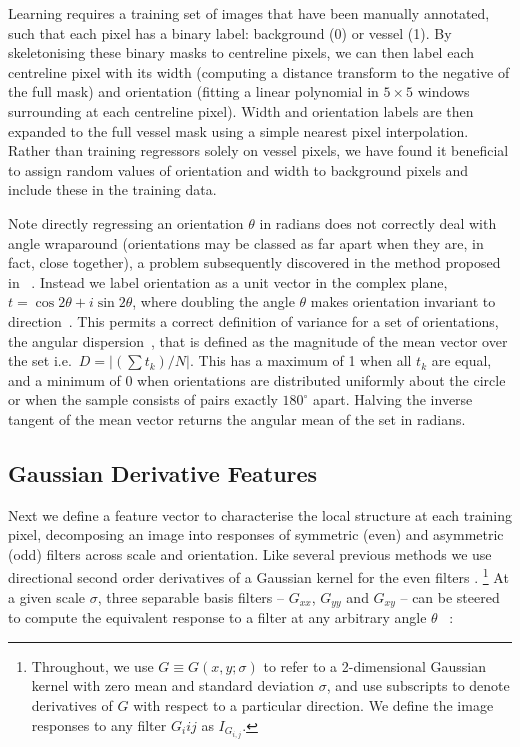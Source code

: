 \documentclass[runningheads,a4paper]{llncs}
\def\Gxx{G_{xx}}
\def\Gxy{G_{xy}}
\def\Gyy{G_{yy}}
\def\ie{i.e.}
\begin{document}
Learning requires a training set of images that have been manually annotated, such that each pixel has a binary label: background (0) or vessel (1). By skeletonising these binary masks to centreline pixels, we can then label each centreline pixel with its width (computing a distance transform to the negative of the full mask) and orientation (fitting a linear polynomial in $5\times5$ windows surrounding at each centreline pixel). Width and orientation labels are then expanded to the full vessel mask using a simple nearest pixel interpolation. Rather than training regressors solely on vessel pixels, we have found it beneficial to assign random values of orientation and width to background pixels and include these in the training data.

Note directly regressing an orientation $\theta$ in radians does not correctly deal with angle wraparound (orientations may be classed as far apart when they are, in fact, close together), a problem subsequently discovered in the method proposed in ~\cite{Berks_etal_IPMI11}. Instead we label orientation as a unit vector in the complex plane, $t = \cos 2\theta + i\sin 2\theta$, where doubling the angle $\theta$ makes orientation invariant to direction~\cite{Mardia_Jupp_00}. This permits a correct definition of variance for a set of orientations, the angular dispersion~\cite{Mardia_Jupp_00}, that is defined as the magnitude of the mean vector over the set \ie~$D = |(\sum{t_k})/N|$. This has a maximum of 1 when all $t_k$ are equal, and a minimum of 0 when orientations are distributed uniformly about the circle or when the sample consists of pairs exactly $180^\circ$ apart. Halving the inverse tangent of the mean vector returns the angular mean of the set in radians. %

\subsection{Gaussian Derivative Features}
Next we define a feature vector to characterise the local structure at each training pixel, decomposing an image into responses of symmetric (even) and asymmetric (odd) filters across scale and orientation. Like several previous methods we use directional second order derivatives of a Gaussian kernel for the even filters \cite{}. \footnote{Throughout, we use $G \equiv G(x,y;\sigma)$ to refer to a 2-dimensional Gaussian kernel with zero mean and standard deviation $\sigma$, and use subscripts to denote derivatives of $G$ with respect to a particular direction. We define the image responses to any filter $G_i{ij}$ as $I_{G_{i,j}}$.} At a given scale $\sigma$, three separable basis filters -- $\Gxx$, $\Gyy$ and $\Gxy$ -- can be steered to compute the equivalent response to a filter at any arbitrary angle $\theta$ ~\cite{Freeman_Adelson_TPAMI91,Koenderink_vanDoorn_TPAMI92,Karssemeijer_teBrake_TMI96}:
\end{document}

